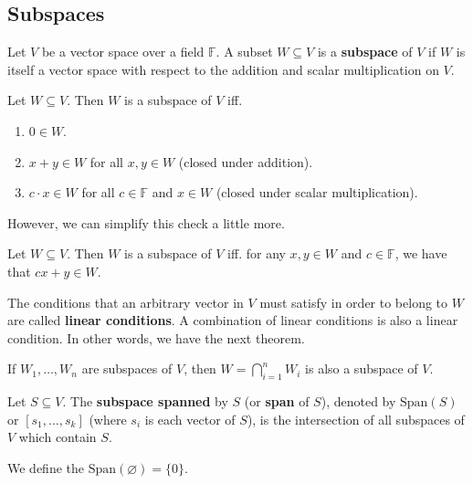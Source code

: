 \subsection{Subspaces}

\begin{definition}[Subspace]
	Let $V$ be a vector space over a field $\mathbb{F}$. A subset $W \subseteq V$ is a \textbf{subspace} of $V$ if $W$ is itself a vector space with respect to the addition and scalar multiplication on $V$.	
\end{definition}

\begin{theorem}
	Let $W \subseteq V$. Then $W$ is a subspace of $V$ iff.
	\begin{enumerate}
		\item $0 \in W$.
		\item $x+y \in W$ for all $x,y \in W$ (closed under addition).
		\item $c \cdot x \in W$ for all $c \in \mathbb{F}$ and $x \in W$ (closed under scalar multiplication).
	\end{enumerate}
\end{theorem}

However, we can simplify this check a little more.

\begin{theorem}
	Let $W \subseteq V$. Then $W$ is a subspace of $V$ iff. for any $x, y \in W$ and $c \in \mathbb{F}$, we have that $cx+y \in W$.
\end{theorem}

The conditions that an arbitrary vector in $V$ must satisfy in order to belong to $W$ are called \textbf{linear conditions}. A combination of linear conditions is also a linear condition. In other words, we have the next theorem.

\begin{theorem}
	If $W_1, \ldots, W_n$ are subspaces of $V$, then $W = \bigcap_{i=1}^n W_i$ is also a subspace of $V$. 
\end{theorem}

\begin{definition}[Span]
	Let $S \subseteq V$. The \textbf{subspace spanned} by $S$ (or \textbf{span} of $S$), denoted by $\text{Span}(S)$ or $[s_1, \ldots, s_k]$ (where $s_i$ is each vector of $S$), is the intersection of all subspaces of $V$ which contain $S$.
	
	We define the $\text{Span}(\varnothing) = \{ 0 \}$.
\end{definition}

